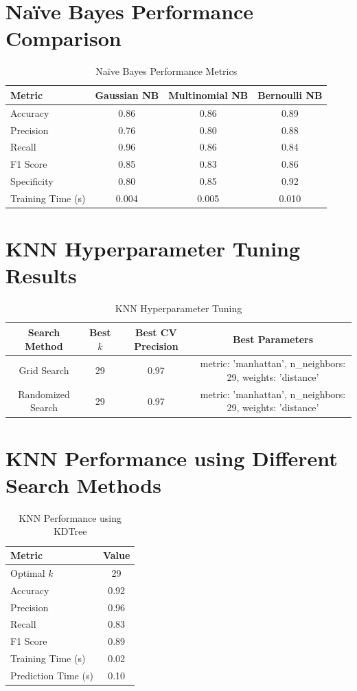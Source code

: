 \documentclass[11pt]{article}
\begin{document}
\section*{Na\"ive Bayes Performance Comparison}
\begin{table}[H]
\centering
\renewcommand{\arraystretch}{1.3}
\caption{Na\"ive Bayes Performance Metrics}
\begin{tabular}{|l|c|c|c|}
\hline
Metric & Gaussian NB & Multinomial NB & Bernoulli NB \\
\hline
Accuracy & 0.86 & 0.86 & 0.89 \\
Precision & 0.76 & 0.80 & 0.88 \\
Recall & 0.96 & 0.86 & 0.84 \\
F1 Score & 0.85 & 0.83 & 0.86 \\
Specificity & 0.80 & 0.85 & 0.92 \\
Training Time (s) & 0.004 & 0.005 & 0.010 \\
\hline
\end{tabular}
\end{table}

\section*{KNN Hyperparameter Tuning Results}
\begin{table}[H]
\centering
\renewcommand{\arraystretch}{1.3}
\caption{KNN Hyperparameter Tuning}
\begin{tabular}{|c|c|c|c|}
\hline
Search Method & Best $k$ & Best CV Precision & Best Parameters \\
\hline
Grid Search & 29 & 0.97 & metric: 'manhattan', n\_neighbors: 29, weights: 'distance' \\
Randomized Search & 29 & 0.97 & metric: 'manhattan', n\_neighbors: 29, weights: 'distance' \\
\hline
\end{tabular}
\end{table}

\section*{KNN Performance using Different Search Methods}

\begin{table}[H]
\centering
\renewcommand{\arraystretch}{1.3}
\caption{KNN Performance using KDTree}
\begin{tabular}{|l|c|}
\hline
Metric & Value \\
\hline
Optimal $k$ & 29 \\
Accuracy & 0.92 \\
Precision & 0.96 \\
Recall &  0.83\\
F1 Score & 0.89\\
Training Time (s) & 0.02\\
Prediction Time (s) & 0.10 \\
\hline
\end{tabular}
\end{table}
\end{document}
